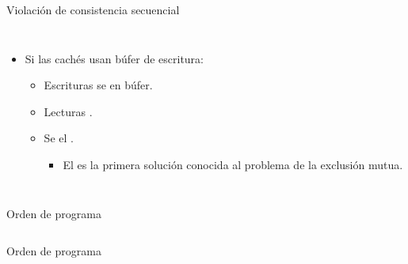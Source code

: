 \begin{frame}[t]{Violación de consistencia secuencial}
\begin{columns}[T]

\makebox[\textwidth][c]{}

\pause 

\begin{itemize}
  \item Si las cachés usan búfer de escritura:
    \begin{itemize}
      \item Escrituras se  en búfer.
      \item Lecturas .
      \item Se  el .
        \begin{itemize}
          \item El  es la primera solución 
                conocida al problema de la exclusión mutua.
        \end{itemize}
    \end{itemize}
\end{itemize}

\end{columns}
\end{frame}

\begin{frame}[t]{Orden de programa}
\begin{columns}[T]

\makebox[\textwidth][c]{}

\makebox[\textwidth][c]{}

\end{columns}
\end{frame}

\begin{frame}[t]{Orden de programa}
\begin{columns}[T]

\makebox[\textwidth][c]{}

\makebox[\textwidth][c]{}

\end{columns}
\end{frame}


